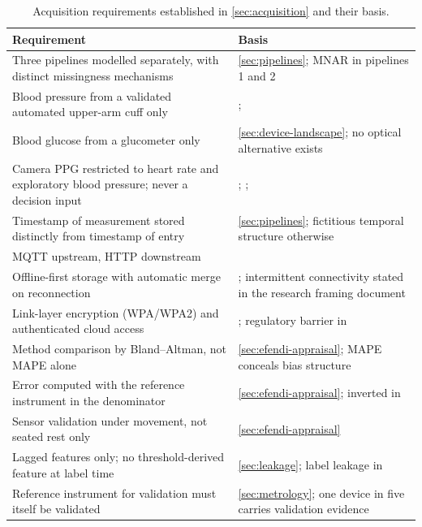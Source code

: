 \documentclass[12pt,a4paper,oneside]{report}
\begin{document}
\begin{table}[htbp]
\centering\footnotesize
\caption{Acquisition requirements established in \cref{sec:acquisition} and their basis.}\label{tab:spec21}
\begin{tabularx}{\textwidth}{@{}X >{\raggedright\arraybackslash}p{5.9cm}@{}}
\toprule
\textbf{Requirement} & \textbf{Basis} \\
\midrule
Three pipelines modelled separately, with distinct missingness mechanisms & \cref{sec:pipelines}; MNAR in pipelines 1 and 2 \\
Blood pressure from a validated automated upper-arm cuff only & \textcite{who2023hypertension}; \textcite{alessa2019} \\
Blood glucose from a glucometer only & \cref{sec:device-landscape}; no optical alternative exists \\
Camera PPG restricted to heart rate and exploratory blood pressure; never a decision input & \textcite{who2023hypertension}; \textcite{alessa2019}; \textcite{liu2025ppg} \\
Timestamp of measurement stored distinctly from timestamp of entry & \cref{sec:pipelines}; fictitious temporal structure otherwise \\
MQTT upstream, HTTP downstream & \textcite{efendi2025} \\
Offline-first storage with automatic merge on reconnection & \textcite{efendi2025}; intermittent connectivity stated in the research framing document \\
Link-layer encryption (WPA/WPA2) and authenticated cloud access & \textcite{efendi2025}; regulatory barrier in \textcite{dodoo2022} \\
Method comparison by Bland--Altman, not MAPE alone & \cref{sec:efendi-appraisal}; MAPE conceals bias structure \\
Error computed with the reference instrument in the denominator & \cref{sec:efendi-appraisal}; inverted in \textcite{efendi2025} \\
Sensor validation under movement, not seated rest only & \cref{sec:efendi-appraisal} \\
Lagged features only; no threshold-derived feature at label time & \cref{sec:leakage}; label leakage in \textcite{efendi2025} \\
Reference instrument for validation must itself be validated & \cref{sec:metrology}; one device in five carries validation evidence \\
\bottomrule
\end{tabularx}
\end{table}
\end{document}
